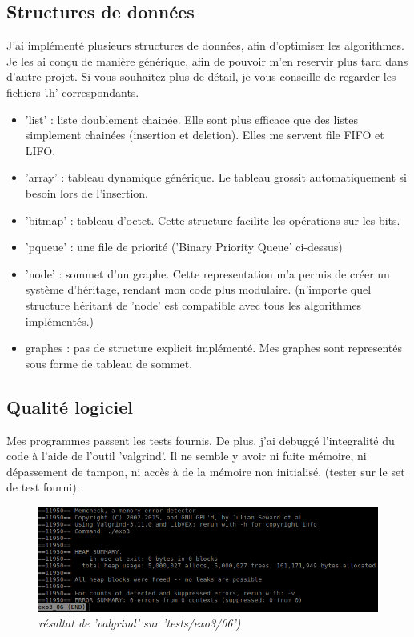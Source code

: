\documentclass[a4paper,10pt]{article}
\begin{document}
    \subsection{Structures de données}
      J'ai implémenté plusieurs structures de données, afin d'optimiser les algorithmes. Je les ai conçu de manière générique,
      afin de pouvoir m'en reservir plus tard dans d'autre projet. Si vous souhaitez plus de détail, je vous
      conseille de regarder les fichiers '.h' correspondants.
      \begin{itemize}[label=-]
	\item 'list'   : liste doublement chainée. Elle sont plus efficace que des listes simplement chainées (insertion et deletion).
			Elles me servent file FIFO et LIFO.
	\item 'array'  : tableau dynamique générique. Le tableau grossit automatiquement si besoin lors de l'insertion.
	\item 'bitmap' : tableau d'octet. Cette structure facilite les opérations sur les bits.
	\item 'pqueue' : une file de priorité ('Binary Priority Queue' ci-dessus)
	\item 'node'   : sommet d'un graphe. Cette representation m'a permis de créer un système d'héritage,
			rendant mon code plus modulaire. (n'importe quel structure héritant de 'node'
			est compatible avec tous les algorithmes implémentés.)
	\item graphes  : pas de structure explicit implémenté. Mes graphes sont representés sous forme de tableau de sommet.
      \end{itemize}
      
      \subsection{Qualité logiciel}
	Mes programmes passent les tests fournis.\newline    
	De plus, j'ai debuggé l'integralité du code à l'aide de l'outil 'valgrind'.
	Il ne semble y avoir ni fuite mémoire, ni dépassement de tampon, ni accès à de la mémoire non initialisé.
	(tester sur le set de test fourni).
	\begin{figure}
	  \begin{center}
	    \includegraphics[width=12cm,height=\textheight,keepaspectratio]{./images/valgrind.png}
	  \end{center}
	  \caption{\textit{résultat de 'valgrind' sur 'tests/exo3/06')}}
	\end{figure}
	
\end{document}
